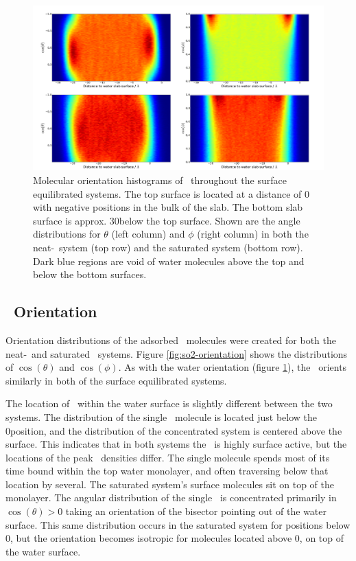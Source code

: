 \begin{figure}[h!]
	\begin{center}
		\includegraphics[scale=1.0]{images/waterorientationsmall.png}
		\caption{Molecular orientation histograms of \wat~throughout the surface equilibrated systems. The top surface is located at a distance of 0 with negative positions in the bulk of the slab. The bottom slab surface is approx. 30\angs below the top surface. Shown are the angle distributions for $\theta$ (left column) and $\phi$ (right column) in both the neat-\wat~system (top row) and the saturated system (bottom row). Dark blue regions are void of water molecules above the top and below the bottom surfaces.}
		\label{fig:water-orientation}
	\end{center}
\end{figure}

\subsection{\suldiox~Orientation}

Orientation distributions of the adsorbed \suldiox~molecules were created for both the neat-\wat~and saturated \suldiox~systems. Figure \ref{fig:so2-orientation} shows the distributions of $\cos(\theta)$ and $\cos(\phi)$. As with the water orientation (figure \ref{fig:water-orientation}), the \suldiox~orients similarly in both of the surface equilibrated systems. 

The location of \suldiox~within the water surface is slightly different between the two systems. The distribution of the single \suldiox~molecule is located just below the 0\angs position, and the distribution of the concentrated system is centered above the surface. This indicates that in both systems the \suldiox~is highly surface active, but the locations of the peak \suldiox~densities differ. The single molecule spends most of its time bound within the top water monolayer, and often traversing below that location by several\angs. The saturated system's surface molecules sit on top of the monolayer. The angular distribution of the single \suldiox~is concentrated primarily in $\cos(\theta)>0$ taking an orientation of the bisector pointing out of the water surface. This same distribution occurs in the saturated system for positions below 0\angs, but the orientation becomes isotropic for molecules located above 0\angs, on top of the water surface.





